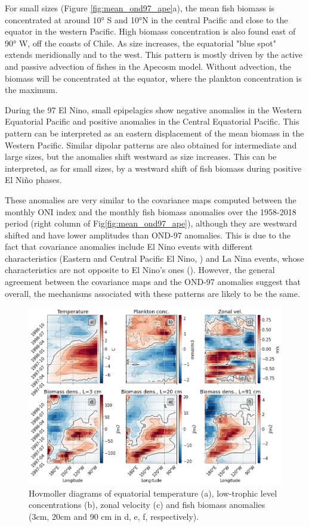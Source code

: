 For small sizes (Figure \ref{fig:mean_ond97_ape}a), the mean fish biomass is concentrated at around 10° S and 10°N in the central Pacific and close to the equator in the western Pacific. High biomass concentration is also found east of 90° W, off the coasts of Chile. As size increases, the equatorial "blue spot" extends meridionally and to the west. This pattern is mostly driven by the active and passive advection of fishes in the Apecosm model. Without advection, the biomass will be concentrated at the equator, where the plankton concentration is the maximum.

During the 97 El Nino, small epipelagics show negative anomalies in the Western Equatorial Pacific and positive anomalies in the Central Equatorial Pacific. This pattern can be interpreted as an eastern displacement of the mean biomass in the Western Pacific. Similar dipolar patterns are also obtained for intermediate and large sizes, but the anomalies shift westward as size increases. This can be interpreted, as for small sizes, by a westward shift of fish biomass during positive El Niño phases.

These anomalies are very similar to the covariance maps computed between the monthly ONI index and the monthly fish biomass anomalies over the 1958-2018 period (right column of Fig\ref{fig:mean_ond97_ape}), although they are westward shifted and have lower amplitudes than OND-97 anomalies. This is due to the fact that covariance anomalies include El Nino events with different characteristics (Eastern and Central Pacific El Nino, )  and La Nina events, whose characteristics are not opposite to El Nino's ones (). However, the general agreement between the covariance maps and the OND-97 anomalies suggest that overall, the mechanisms associated with these patterns are likely to be the same.


\begin{figure}
	\centering
	\includegraphics[scale=0.4]{figs/fig5.png}	
	\caption{Hovmoller diagrams of equatorial temperature (a), low-trophic level concentrations (b), zonal velocity (c) and fish biomass anomalies (3cm, 20cm and 90 cm in d, e, f, respectively).}	
	\label{fig:hov_nemo_ape}
\end{figure}

